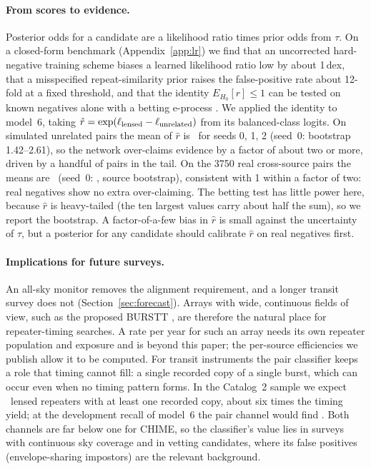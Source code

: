 \documentclass[fleqn,usenatbib]{mnras}
\begin{document}
\paragraph*{From scores to evidence.}
Posterior odds for a candidate are a likelihood ratio times prior odds from $\tau$.
On a closed-form benchmark (Appendix~\ref{app:lr}) we find that an uncorrected hard-negative training scheme biases a learned
likelihood ratio low by about 1\,dex, that a misspecified repeat-similarity prior raises the false-positive rate about
12-fold at a fixed threshold, and that the identity $E_{H_0}[r]\le1$ can be tested on known negatives alone with a betting
e-process \citep{WaudbySmith2024,Ramdas2024}.
We applied the identity to model~6, taking $\hat r=\exp(\ell_{\rm lensed}-\ell_{\rm unrelated})$ from its balanced-class logits.
On simulated unrelated pairs the mean of $\hat r$ is \EhSimSeeds\ for seeds 0, 1, 2 (seed~0: bootstrap 1.42--2.61), so
the network over-claims evidence by a factor of about two or more, driven by a handful of pairs in the tail. On the 3750 real
cross-source pairs the means are \EhRealSeeds\ (seed~0: \EhReal, source bootstrap), consistent with 1 within a factor of
two: real negatives show no extra over-claiming. The betting test has little power here, because $\hat r$ is heavy-tailed
(the ten largest values carry about half the sum), so we report the bootstrap. A factor-of-a-few bias in $\hat r$ is small
against the uncertainty of $\tau$, but a posterior for any candidate should calibrate $\hat r$ on real negatives first.

\paragraph*{Implications for future surveys.}
An all-sky monitor removes the alignment requirement, and a longer transit survey does not
(Section~\ref{sec:forecast}). Arrays with wide, continuous fields of view, such as the proposed BURSTT \citep{Ho2023}, are
therefore the natural place for repeater-timing searches. A rate per year for such an array needs its own repeater
population and exposure and is beyond this paper; the per-source efficiencies we publish allow it to be computed.
For transit instruments the pair classifier keeps a role that timing cannot fill: a single recorded copy of a single burst,
which can occur even when no timing pattern forms. In the Catalog~2 sample we expect \NexpEcho\ lensed repeaters with at
least one recorded copy, about six times the timing yield; at the development recall of model~6 the pair channel would
find \NexpEchoPair. Both channels are far below one for CHIME, so the classifier's value lies in surveys with continuous
sky coverage and in vetting candidates, where its false positives (envelope-sharing impostors) are the relevant background.
\end{document}
